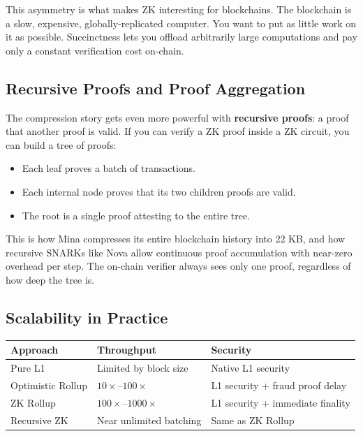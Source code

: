 This asymmetry is what makes ZK interesting for blockchains. The blockchain is a slow, expensive, globally-replicated computer. You want to put as little work on it as possible. Succinctness lets you offload arbitrarily large computations and pay only a constant verification cost on-chain.

\subsection*{Recursive Proofs and Proof Aggregation}

The compression story gets even more powerful with \textbf{recursive proofs}: a proof that another proof is valid. If you can verify a ZK proof inside a ZK circuit, you can build a tree of proofs:

\begin{itemize}
  \item Each leaf proves a batch of transactions.
  \item Each internal node proves that its two children proofs are valid.
  \item The root is a single proof attesting to the entire tree.
\end{itemize}

This is how Mina compresses its entire blockchain history into 22 KB, and how recursive SNARKs like Nova allow continuous proof accumulation with near-zero overhead per step. The on-chain verifier always sees only one proof, regardless of how deep the tree is.

\subsection*{Scalability in Practice}

\begin{center}
\begin{tabular}{lll}
  \hline
  \textbf{Approach}     & \textbf{Throughput} & \textbf{Security} \\
  \hline
  Pure L1               & Limited by block size & Native L1 security \\
  Optimistic Rollup     & $10\times$--$100\times$ & L1 security + fraud proof delay \\
  ZK Rollup             & $100\times$--$1000\times$ & L1 security + immediate finality \\
  Recursive ZK          & Near unlimited batching & Same as ZK Rollup \\
  \hline
\end{tabular}
\end{center}

